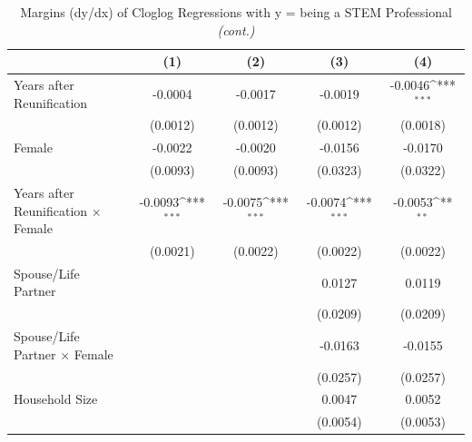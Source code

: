 \documentclass[11pt, aspectratio=1610, xcolor={dvipsnames}]{beamer}
\def\sym#1{\ifmmode^{#1}\else\(^{#1}\)\fi}
\begin{document}
	\begin{frame}
		\frametitle{}
		
		{\linespread{1}\tiny
			\begin{table}[h]
				\centering
				\caption{Margins (dy/dx) of Cloglog Regressions with y = being a STEM Professional \emph{(cont.)}}
				\label{tab:margins2b}
				\begin{tabular}{l*{4}{c}}
					\toprule
					&\multicolumn{1}{c}{(1)}         &\multicolumn{1}{c}{(2)}         &\multicolumn{1}{c}{(3)}         &\multicolumn{1}{c}{(4)}         \\
					\midrule
					Years after Reunification&     -0.0004         &     -0.0017         &     -0.0019         &     -0.0046\sym{***}\\
					&    (0.0012)         &    (0.0012)         &    (0.0012)         &    (0.0018)         \\
					\addlinespace
					Female              &     -0.0022         &     -0.0020         &     -0.0156         &     -0.0170         \\
					&    (0.0093)         &    (0.0093)         &    (0.0323)         &    (0.0322)         \\
					\addlinespace
					Years after Reunification $\times$ Female&     -0.0093\sym{***}&     -0.0075\sym{***}&     \textcolor{PineGreen}{-0.0074\sym{***}}&     -0.0053\sym{**} \\
					&    (0.0021)         &    (0.0022)         &    \textcolor{PineGreen}{(0.0022)}         &    (0.0022)         \\
					\midrule
					Spouse/Life Partner &                     &                     &      \textcolor{PineGreen}{0.0127}         &      0.0119         \\
					&                     &                     &    \textcolor{PineGreen}{(0.0209)}         &    (0.0209)         \\
					\addlinespace
					Spouse/Life Partner $\times$ Female&                     &                     &     \textcolor{PineGreen}{-0.0163}         &     -0.0155         \\
					&                     &                     &    \textcolor{PineGreen}{(0.0257)}         &    (0.0257)         \\
					\addlinespace
					Household Size      &                     &                     &      \textcolor{PineGreen}{0.0047}         &      0.0052         \\
					&                     &                     &    \textcolor{PineGreen}{(0.0054)}         &    (0.0053)         \\

\end{tabular}
\end{table}}
\end{frame}
\end{document}
